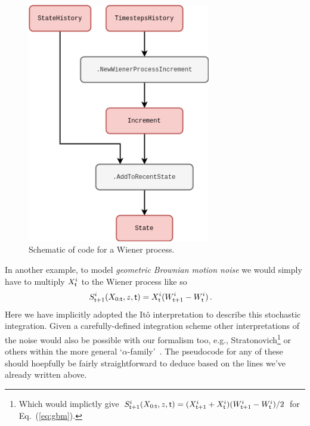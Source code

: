 \begin{figure}[h]
\centering
\includegraphics[width=8cm]{images/chapter-1-wiener-process.drawio.png}
\caption{Schematic of code for a Wiener process.}
\label{fig:wiener-process}
\end{figure}

In another example, to model \emph{geometric Brownian motion noise} we would simply have to multiply $X^i_{\sf t}$ to the Wiener process like so
\begin{align}
& S^{i}_{{\sf t}+1}(X_{0:{\sf t}},z,{\sf t}) = X^i_{\sf t}(W^i_{{\sf t}+1}-W^i_{\sf t})\label{eq:gbm} \,.
\end{align}
Here we have implicitly adopted the Itô interpretation to describe this stochastic integration. Given a carefully-defined integration scheme other interpretations of the noise would also be possible with our formalism too, e.g., Stratonovich\footnote{Which would implictly give $S^{i}_{{\sf t}+1}(X_{0:{\sf t}},z,{\sf t}) = (X^i_{{\sf t}+1}+X^i_{\sf t})(W^i_{{\sf t}+1}-W^i_{\sf t}) / 2$ for Eq.~(\ref{eq:gbm}).} or others within the more general `$\alpha$-family'~\cite{van1992stochastic,risken1996fokker,rog-will-2000}. The pseudocode for any of these should hoepfully be fairly straightforward to deduce based on the lines we've already written above.

